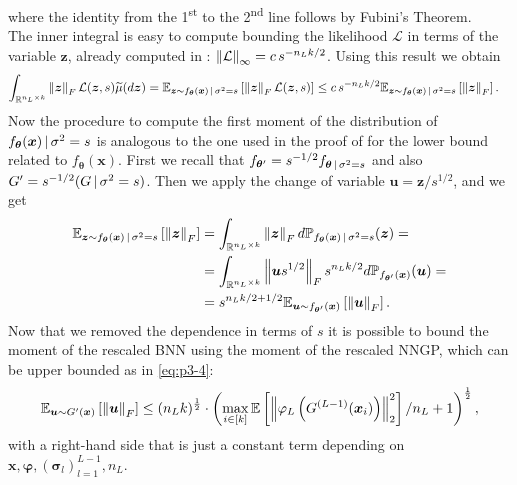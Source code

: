 where the identity from the 1\textsuperscript{st} to the 2\textsuperscript{nd} line follows by Fubini's Theorem. \\
The inner integral is easy to compute bounding the likelihood $\mathcal{L}$ in terms of the variable $\bm{z}$, already computed in : $\norm{\mathcal{L}}_{\infty} = c \, s^{-n_L k / 2}$. Using this result we obtain
\begin{align*}
	\int_{\real^{n_L \times k}} \norm{\bm{z}}_F \mathcal{L}(\bm{z}, s) \widetilde{\mu}(d\bm{z}) & = \mean[\bm{z} \sim f_{\bm{\theta}}(\bm{x}) \given \sigma^2 = s]{\norm{\bm{z}}_F \mathcal{L}(\bm{z}, s)} \leq c \, s^{-n_L k / 2} \mean[\bm{z} \sim f_{\bm{\theta}}(\bm{x}) \given \sigma^2 = s]{\norm{\bm{z}}_F}.
\end{align*}
Now the procedure to compute the first moment of the distribution of $ f_{\bm{\theta}}(\bm{x}) \given \sigma^2 = s$ is analogous to the one used in the proof of  for the lower bound related to $f_{\bm{\theta}}(\bm{x})$.
First we recall that $f_{\bm{\theta}'} = s^{-1/2} f_{\bm{\theta} \given \sigma^2 = s}$ and also $G' = s^{-1/2} (G \given \sigma^2 = s)$.
Then we apply the change of variable $\bm{u} = \bm{z} / s^{1/2}$, and we get
\begin{equation*}
	\begin{aligned}
		\mean[\bm{z} \sim f_{\bm{\theta}}(\bm{x}) \given \sigma^2 = s]{\norm{\bm{z}}_F} & = \int_{\real^{n_L \times k}} \norm{\bm{z}}_F d \mathbb{P}_{f_{\bm{\theta}}(\bm{x}) \given \sigma^2 = s}(\bm{z}) = \\
		& = \int_{\real^{n_L \times k}} \norm{\bm{u} s^{1/2}}_F s^{n_L k / 2} d \mathbb{P}_{f_{\bm{\theta}'}(\bm{x})}(\bm{\bm{u}}) = \\
		& = s^{n_L k / 2 + 1/2} \mean[\bm{u} \sim f_{\bm{\theta}'}(\bm{x})]{\norm{\bm{u}}_F}.
	\end{aligned}
\end{equation*}
Now that we removed the dependence in terms of $s$ it is possible to bound the moment of the rescaled BNN using the moment of the rescaled NNGP, which can be upper bounded as in \cref{eq:p3-4}:
\begin{equation*}
	\mean[\bm{u} \sim G'(\bm{x})]{\norm{\bm{u}}_F} \leq (n_L k)^{\frac{1}{2}} \cdot \left(\max_{i \in [k]} \mean{\norm{\varphi_L\left(G^{(L - 1)}(\bm{x}_i)\right)}_2^2} / n_L + 1\right)^{\frac{1}{2}},
\end{equation*}
with a right-hand side that is just a constant term depending on $\bm{x}, \bm{\varphi}, (\bm{\sigma}_l)_{l = 1}^{L - 1}, n_L$. \\
